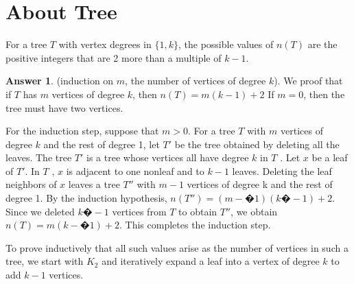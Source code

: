 \documentclass[a4paper]{article}
\renewcommand{\(}{\left(}
\renewcommand{\)}{\right)}
\theoremstyle{plain}
\theoremstyle{plain}
\theoremstyle{definition}
\newtheorem*{answer}{Answer}
\begin{document}
\section{About Tree}
For a tree $T$ with vertex degrees in $\{1, k\}$, the possible values of $n(T)$ are the positive integers that are 2 more than a multiple of $k − 1$.
\begin{shaded}
\begin{answer}
(induction on $m$, the number of vertices of degree $k$). We proof that if $T$ has $m$ vertices of degree $k$, then $n(T) = m(k -1) + 2$ If $m = 0$, then the tree must have two vertices.

For the induction step, suppose that $m > 0$. For a tree $T$ with $m$ vertices of degree $k$ and the rest of degree 1, let $T'$  be the tree obtained by deleting all the leaves. The tree $T'$  is a tree whose vertices all have degree $k$ in $T$ . Let $x$ be a leaf of $T'$. In $T$ , $x$ is adjacent to one non­leaf and to $k -1$ leaves. Deleting the leaf neighbors of $x$ leaves a tree $T''$  with $m - 1$ vertices of degree k and the rest of degree 1. By the induction hypothesis, $n(T'' ) = (m -�1)(k �-1) +2$. Since we deleted $k �-1 $ vertices from $T$ to obtain $T''$, we obtain $n(T) = m(k -�1) + 2$. This completes the induction step.

To prove inductively that all such values arise as the number of vertices in such a tree, we start with $K_2$ and iteratively expand a leaf into a vertex of degree $k$ to add $k - 1$ vertices.
\end{answer}
\end{shaded}
\end{document}

